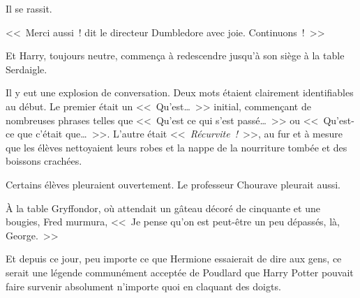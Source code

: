 Il se rassit.

<<~Merci aussi~! dit le directeur Dumbledore avec joie. Continuons~!~>>

Et Harry, toujours neutre, commença à redescendre jusqu'à son siège à la table Serdaigle.

Il y eut une explosion de conversation. Deux mots étaient clairement identifiables au début. Le premier était un <<~Qu'est…~>> initial, commençant de nombreuses phrases telles que <<~Qu'est ce qui s'est passé…~>> ou <<~Qu'est-ce que c'était que…~>>. L'autre était <<~\emph{Récurvite~!}~>>, au fur et à mesure que les élèves nettoyaient leurs robes et la nappe de la nourriture tombée et des boissons crachées.

Certains élèves pleuraient ouvertement. Le professeur Chourave pleurait aussi.

À la table Gryffondor, où attendait un gâteau décoré de cinquante et une bougies, Fred murmura, <<~Je pense qu'on est peut-être un peu dépassés, là, George.~>>

Et depuis ce jour, peu importe ce que Hermione essaierait de dire aux gens, ce serait une légende communément acceptée de Poudlard que Harry Potter pouvait faire survenir absolument n'importe quoi en claquant des doigts.~
